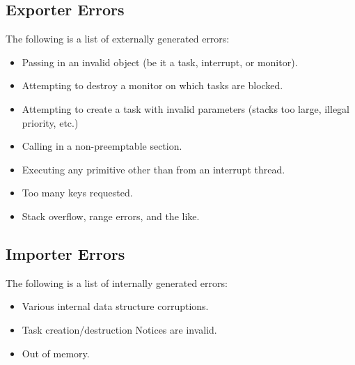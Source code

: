 \subsection{Exporter Errors}
The following is a list of externally generated errors:
\begin{itemize}
\item
    Passing in an invalid object (be it a task, interrupt, or monitor).
\item
    Attempting to destroy a monitor on which tasks are blocked.
\item
    Attempting to create a task with invalid parameters (stacks too large, 
    illegal priority, etc.)
\item
    Calling  in a non-preemptable section.
\item
    Executing any primitive other than  from an interrupt 
    thread.
\item
    Too many  keys requested.
\item
    Stack overflow, range errors, and the like.
\end{itemize}

\subsection{Importer Errors}
The following is a list of internally generated errors:
\begin{itemize}
\item
    Various internal data structure corruptions.
\item
    Task creation/destruction Notices are invalid.
\item
    Out of memory.
\end{itemize}

